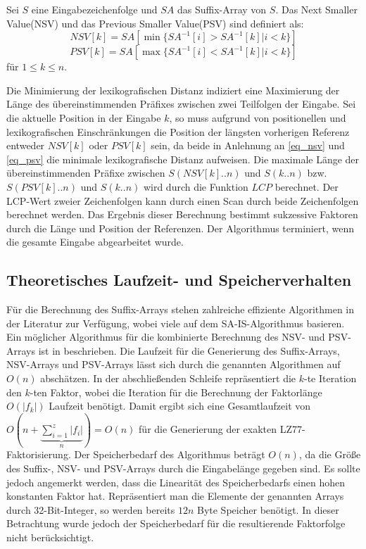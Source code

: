 Sei $S$ eine Eingabezeichenfolge und $SA$ das Suffix-Array von $S$. Das Next Smaller Value(NSV) und das Previous Smaller Value(PSV) sind definiert als:
\begin{equation} \label{eq_nsv}
    NSV[k] = SA[\min\{SA^{-1}[i] > SA^{-1}[k] | i < k\}]
\end{equation}
\begin{equation} \label{eq_psv}
    PSV[k] = SA[\max\{SA^{-1}[i] < SA^{-1}[k] | i < k\}]
\end{equation}
für $1\leq k \leq n$.

Die Minimierung der lexikografischen Distanz indiziert eine Maximierung der Länge des übereinstimmenden Präfixes zwischen zwei Teilfolgen der Eingabe.
Sei die aktuelle Position in der Eingabe $k$, so muss aufgrund von positionellen und lexikografischen Einschränkungen die 
Position der längsten vorherigen Referenz entweder $NSV[k]$ oder $PSV[k]$ sein, da beide in Anlehnung an \ref{eq_nsv} und \ref{eq_psv} die
minimale lexikografische Distanz aufweisen. Die maximale Länge der übereinstimmenden Präfixe zwischen $S(NSV[k]..n)$ und $S(k..n)$ bzw. $S(PSV[k]..n)$ 
und $S(k..n)$ wird durch die Funktion $LCP$ berechnet. Der LCP-Wert zweier Zeichenfolgen kann durch einen Scan durch beide
Zeichenfolgen berechnet werden. Das Ergebnis dieser Berechnung bestimmt sukzessive Faktoren durch die Länge und Position der Referenzen. Der Algorithmus 
terminiert, wenn die gesamte Eingabe abgearbeitet wurde.

\subsection{Theoretisches Laufzeit- und Speicherverhalten}
Für die Berechnung des Suffix-Arrays stehen zahlreiche effiziente Algorithmen in der Literatur zur Verfügung, wobei viele auf dem SA-IS-Algorithmus 
\cite{sais} basieren. Ein möglicher Algorithmus für die kombinierte Berechnung des NSV- und PSV-Arrays ist in \cite{nsvpsv} beschrieben. Die Laufzeit für
die Generierung des Suffix-Arrays, NSV-Arrays und PSV-Arrays lässt sich durch die genannten Algorithmen auf $O(n)$ abschätzen. In der abschließenden 
Schleife repräsentiert die $k$-te Iteration den $k$-ten Faktor, wobei die Iteration für die Berechnung der Faktorlänge $O(|f_k|)$ Laufzeit benötigt. 
Damit ergibt sich eine Gesamtlaufzeit von $O(n +\underbrace{\sum_{i=1}^{z} |f_i|}_{n}) = O(n)$ für die Generierung der exakten LZ77-Faktorisierung.
Der Speicherbedarf des Algorithmus beträgt $O(n)$, da die Größe des Suffix-, NSV- und PSV-Arrays durch die Eingabelänge gegeben sind. Es sollte jedoch
angemerkt werden, dass die Linearität des Speicherbedarfs einen hohen konstanten Faktor hat. Repräsentiert man die Elemente der genannten Arrays durch 32-Bit-Integer,
so werden bereits $12n$ Byte Speicher benötigt. In dieser Betrachtung wurde jedoch der Speicherbedarf für die resultierende Faktorfolge nicht berücksichtigt.


